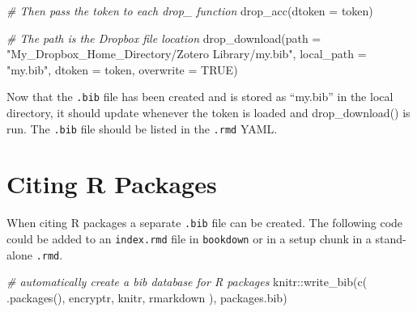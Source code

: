 \documentclass[
]{book}
\newenvironment{Shaded}{\begin{snugshade}}{\end{snugshade}}
\newcommand{\AttributeTok}[1]{\textcolor[rgb]{0.77,0.63,0.00}{#1}}
\newcommand{\CommentTok}[1]{\textcolor[rgb]{0.56,0.35,0.01}{\textit{#1}}}
\newcommand{\ConstantTok}[1]{\textcolor[rgb]{0.00,0.00,0.00}{#1}}
\newcommand{\FunctionTok}[1]{\textcolor[rgb]{0.00,0.00,0.00}{#1}}
\newcommand{\NormalTok}[1]{#1}
\newcommand{\SpecialCharTok}[1]{\textcolor[rgb]{0.00,0.00,0.00}{#1}}
\newcommand{\StringTok}[1]{\textcolor[rgb]{0.31,0.60,0.02}{#1}}
\begin{document}
\begin{Shaded}
\begin{Highlighting}[]
\CommentTok{\# Then pass the token to each drop\_ function}
\FunctionTok{drop\_acc}\NormalTok{(}\AttributeTok{dtoken =}\NormalTok{ token)}
 
\CommentTok{\# The path is the Dropbox file location}
\FunctionTok{drop\_download}\NormalTok{(}\AttributeTok{path =} \StringTok{"My\_Dropbox\_Home\_Directory/Zotero Library/my.bib"}\NormalTok{, }
              \AttributeTok{local\_path =} \StringTok{"my.bib"}\NormalTok{, }
              \AttributeTok{dtoken =}\NormalTok{ token,}
              \AttributeTok{overwrite =} \ConstantTok{TRUE}\NormalTok{)}
\end{Highlighting}
\end{Shaded}

Now that the \texttt{.bib} file has been created and is stored as ``my.bib'' in the local directory, it should update whenever the token is loaded and drop\_download() is run. The \texttt{.bib} file should be listed in the \texttt{.rmd} YAML.

\hypertarget{citing-r-packages}{%
\section{Citing R Packages}\label{citing-r-packages}}

When citing R packages a separate \texttt{.bib} file can be created. The following code could be added to an \texttt{index.rmd} file in \texttt{bookdown} or in a setup chunk in a stand-alone \texttt{.rmd}.

\begin{Shaded}
\begin{Highlighting}[]
\CommentTok{\# automatically create a bib database for R packages}
\NormalTok{knitr}\SpecialCharTok{::}\FunctionTok{write\_bib}\NormalTok{(}\FunctionTok{c}\NormalTok{(}
  \FunctionTok{.packages}\NormalTok{(), }\StringTok{\textquotesingle{}encryptr\textquotesingle{}}\NormalTok{, }\StringTok{\textquotesingle{}knitr\textquotesingle{}}\NormalTok{, }\StringTok{\textquotesingle{}rmarkdown\textquotesingle{}}
\NormalTok{), }\StringTok{\textquotesingle{}packages.bib\textquotesingle{}}\NormalTok{)}
\end{Highlighting}
\end{Shaded}


  
\end{document}
